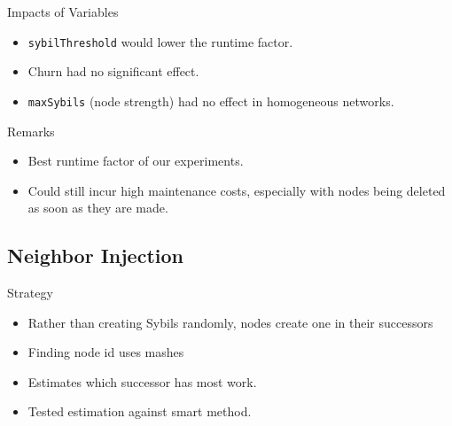\documentclass[11pt]{beamer}
\begin{document}
\begin{frame}{Impacts of Variables}
	\begin{itemize}
		\item \texttt{sybilThreshold} would lower the runtime factor.  
		\item Churn had no significant effect.
		\item \texttt{maxSybils} (node strength) had no effect in homogeneous networks.
	\end{itemize}
\end{frame}


\begin{frame}{Remarks}
	\begin{itemize}
		\item Best runtime factor of our experiments.
		\item Could still incur high maintenance costs, especially with nodes being deleted as soon as they are made.
	\end{itemize}
\end{frame}






\subsection{Neighbor Injection}
\begin{frame}{Strategy}
	\begin{itemize}
		\item Rather than creating Sybils randomly, nodes create one in their successors
		\item Finding node id uses mashes
		\item Estimates which successor has most work.
		\item Tested estimation against smart method.
	\end{itemize}
\end{frame}
\end{document}
